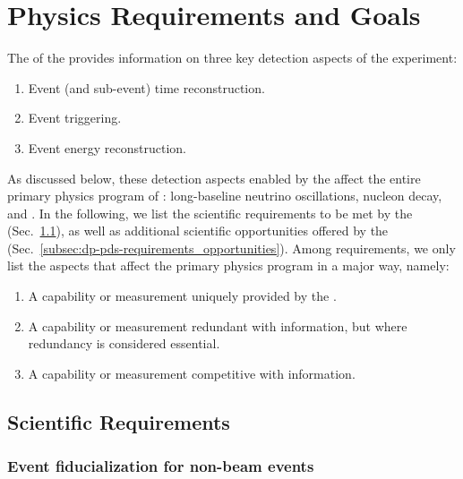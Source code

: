 \section{Physics Requirements and Goals}
\label{sec:dp-pds-requirements}

The  of the \dune {} provides information on three key detection aspects of the experiment:

\begin{enumerate}
\item Event (and sub-event) time reconstruction.
\item Event triggering.
\item Event energy reconstruction.
\end{enumerate}

As discussed below, these detection aspects enabled by the  affect the entire primary physics program of \dune: long-baseline neutrino oscillations, nucleon decay, and . In the following, we list the scientific requirements to be met by the  (Sec.~\ref{subsec:dp-pds-requirements_requirements}), as well as additional scientific opportunities offered by the  (Sec.~\ref{subsec:dp-pds-requirements_opportunities}). Among requirements, we only list the  aspects that affect the \dune primary physics program in a major way, namely: 
\begin{enumerate}
\item A capability or measurement uniquely provided by the .
\item A capability or measurement redundant with  information, but where redundancy is considered essential.
\item A capability or measurement competitive with  information.
\end{enumerate}


\subsection{Scientific Requirements}
\label{subsec:dp-pds-requirements_requirements}

\subsubsection{Event fiducialization for non-beam events}

